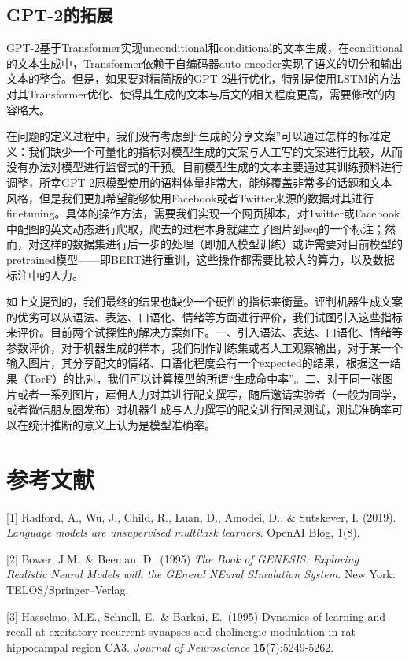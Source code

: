 \documentclass{article}
\begin{document}
\begin{CJK*}{UTF8}{gbsn}
\subsection{GPT-2的拓展}
\par{GPT-2基于Transformer实现unconditional和conditional的文本生成，在conditional的文本生成中，Transformer依赖于自编码器auto-encoder实现了语义的切分和输出文本的整合。但是，如果要对精简版的GPT-2进行优化，特别是使用LSTM的方法对其Transformer优化、使得其生成的文本与后文的相关程度更高，需要修改的内容略大。}
\par{在问题的定义过程中，我们没有考虑到“生成的分享文案”可以通过怎样的标准定义：我们缺少一个可量化的指标对模型生成的文案与人工写的文案进行比较，从而没有办法对模型进行监督式的干预。目前模型生成的文本主要通过其训练预料进行调整，所幸GPT-2原模型使用的语料体量非常大，能够覆盖非常多的话题和文本风格，但是我们更加希望能够使用Facebook或者Twitter来源的数据对其进行finetuning。具体的操作方法，需要我们实现一个网页脚本，对Twitter或Facebook中配图的英文动态进行爬取，爬去的过程本身就建立了图片到seq的一个标注；然而，对这样的数据集进行后一步的处理（即加入模型训练）或许需要对目前模型的pretrained模型——即BERT进行重训，这些操作都需要比较大的算力，以及数据标注中的人力。
}
\par{如上文提到的，我们最终的结果也缺少一个硬性的指标来衡量。评判机器生成文案的优劣可以从语法、表达、口语化、情绪等方面进行评价，我们试图引入这些指标来评价。目前两个试探性的解决方案如下。一、引入语法、表达、口语化、情绪等参数评价，对于机器生成的样本，我们制作训练集或者人工观察输出，对于某一个输入图片，其分享配文的情绪、口语化程度会有一个expected的结果，根据这一结果（TorF）的比对，我们可以计算模型的所谓“生成命中率”。二、对于同一张图片或者一系列图片，雇佣人力对其进行配文撰写，随后邀请实验者（一般为同学，或者微信朋友圈发布）对机器生成与人力撰写的配文进行图灵测试，测试准确率可以在统计推断的意义上认为是模型准确率。
}


\section*{参考文献}

\small

[1] Radford, A., Wu, J., Child, R., Luan, D., Amodei, D., \& Sutskever, I. (2019). {\it Language models are unsupervised multitask learners.} OpenAI Blog, 1(8).

[2] Bower, J.M.\ \& Beeman, D.\ (1995) {\it The Book of GENESIS: Exploring
  Realistic Neural Models with the GEneral NEural SImulation System.}  New York:
TELOS/Springer--Verlag.

[3] Hasselmo, M.E., Schnell, E.\ \& Barkai, E.\ (1995) Dynamics of learning and
recall at excitatory recurrent synapses and cholinergic modulation in rat
hippocampal region CA3. {\it Journal of Neuroscience} {\bf 15}(7):5249-5262.

\end{CJK*}
\end{document}

